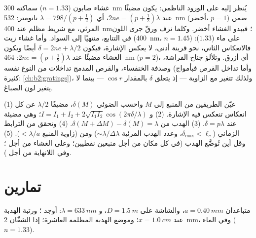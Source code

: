 \begin{example}\label{ex:b2:two-wave-interference:colours}
غشاء صابون ($n = 1.33$) سماكته \qty{300}{nm} يُنظر إليه على الورود الناظمي:
يكون مضيئًا عند $2ne = (p + \tfrac12)\lambda$، أي $\lambda = 798/(p + \tfrac12)$ نانومتر: \qty{532}{nm}
(أخضر، $p = 1$) ضمن المرئي، مع شريط مظلم عند \qty{400}{nm}؛
فيبدو الغشاء أخضر. وكلما نزف ورقّ جرى اللون في
التتابع، منتهيًا إلى السواد. وأما غشاء زيت (\qty{400}{nm}، $n = 1.45$) على ماء
($1.33$): فالانعكاس الثاني، نحو قرينة أدنى، لا يعكس
الإشارة، فيكون $\delta = 2ne + \lambda/2$ أيضًا ويكون الغشاء مضيئًا عند $2ne =
(p + \tfrac12)\lambda$: \qty{464}{nm} ($p = 2$)، أي أزرق. وتلألؤ
جناح الفراشة، وصدفة الخنفساء، والقرص المدمج تداخلات
من النوع نفسه (وأما تداخل القرص فبأمواج كثيرة: \cref{ch:b2:gratings})،
ولذلك تتغير مع الزاوية --- إذ يتعلق $\delta$ بالمقدار $\cos r$ ---
بينما لا يتغير لون الصباغ.
\end{example}

\begin{method}\label{met:b2:two-wave-interference:method}
(1) عيّن الطريقين من المنبع إلى $M$ واحسب
 الضوئي $\delta(M)$، مضيفًا $\lambda/2$ عن كل انعكاس
تنعكس فيه الإشارة. (2) و $I = I_1 + I_2 + 2\sqrt{I_1I_2}\cos(2\pi\delta/\lambda)$؛
وهي مضيئة عند $\delta = p\lambda$. (3)  الهدب من $\delta(M + \Delta M) - \delta(M) =
\lambda$. (4) وتحقق من الترابط الزماني ($\delta_{\max} < \ell_c$، وعدد
الهدب المرئية $\sim\lambda/\Delta\lambda$) ومن  (زاوية المنبع
$< \lambda/a$). (5) وقل أين تُوضَّع الهدب (في كل مكان من أجل منبعين
نقطيين؛ وعلى الغشاء من أجل ؛ وفي اللانهاية
من أجل ).
\end{method}

\section{تمارين}

\begin{exercise}[$\star$]\label{exo:b2:two-wave-interference:1}
 متباعدان $a = \qty{0.40}{mm}$، والشاشة على $D = \qty{1.5}{m}$، و $\lambda =
\qty{633}{nm}$: أوجد ؛ ورتبة الهدبة عند $x = \qty{1.0}{cm}$؛ وموضع
الهدبة المظلمة العاشرة؛  إذا  الشقّان \qty{2}{mm}،
وفي الماء ($n = 1.33$).
\end{exercise}

